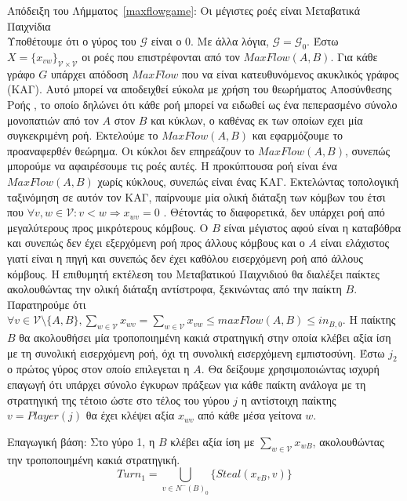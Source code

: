 \begin{sepproof}{Απόδειξη του Λήμματος~\ref{maxflowgame}: Οι μέγιστες ροές είναι Μεταβατικά Παιχνίδια} \ \\
\label{maxflowgameproof}
  Υποθέτουμε ότι ο γύρος του $\mathcal{G}$ είναι ο 0. Με άλλα λόγια, $\mathcal{G} = \mathcal{G}_0$. Έστω $X =
  \{x_{vw}\}_{\mathcal{V} \times \mathcal{V}}$ οι ροές που επιστρέφονται από τον $MaxFlow\left(A, B\right)$. Για κάθε γράφο
  $G$ υπάρχει απόδοση $MaxFlow$ που να είναι κατευθυνόμενος ακυκλικός γράφος (ΚΑΓ). Αυτό μπορεί να αποδειχθεί εύκολα με χρήση
  του θεωρήματος Αποσύνθεσης Ροής \cite{amo}, το οποίο δηλώνει ότι κάθε ροή μπορεί να ειδωθεί ως ένα πεπερασμένο σύνολο
  μονοπατιών από τον $A$ στον $B$ και κύκλων, ο καθένας εκ των οποίων εχει μία συγκεκριμένη ροή. Εκτελούμε το $MaxFlow\left(A,
  B\right)$ και εφαρμόζουμε το προαναφερθέν θεώρημα. Οι κύκλοι δεν επηρεάζουν το $MaxFlow\left(A, B\right)$, συνεπώς μπορούμε
  να αφαιρέσουμε τις ροές αυτές. Η προκύπτουσα ροή είναι ένα $MaxFlow\left(A, B\right)$ χωρίς κύκλους, συνεπώς είναι ένας ΚΑΓ.
  Εκτελώντας τοπολογική ταξινόμηση σε αυτόν τον ΚΑΓ, παίρνουμε μία ολική διάταξη των κόμβων του έτσι που $\forall v, w \in
  \mathcal{V} : v < w \Rightarrow x_{wv} = 0$ \cite{clrs}. Θέτοντάς το διαφορετικά, δεν υπάρχει ροή από μεγαλύτερους προς
  μικρότερους κόμβους. Ο $B$ είναι μέγιστος αφού είναι η καταβόθρα και συνεπώς δεν έχει εξερχόμενη ροή προς άλλους κόμβους και
  ο $A$ είναι ελάχιστος γιατί είναι η πηγή και συνεπώς δεν έχει καθόλου εισερχόμενη ροή από άλλους κόμβους. Η επιθυμητή
  εκτέλεση του Μεταβατικού Παιχνιδιού θα διαλέξει παίκτες ακολουθώντας την ολική διάταξη αντίστροφα, ξεκινώντας από την παίκτη
  $B$. Παρατηρού\-με ότι $\forall v \in \mathcal{V} \setminus \{A, B\}, \sum\limits_{w \in \mathcal{V}}x_{wv} = \sum\limits_{w
  \in \mathcal{V}}x_{vw} \leq maxFlow\left(A, B\right) \leq in_{B, 0}$. Η παίκτης $B$ θα ακολουθήσει μία τροποποιημένη κακιά
  στρατηγική στην οποία κλέβει αξία ίση με τη συνολική εισερχόμενη ροή, όχι τη συνολική εισερχόμενη εμπιστοσύνη. Έστω $j_2$ ο
  πρώτος γύρος στον οποίο επιλεγεται η $A$. Θα δείξουμε χρησιμοποιώντας ισχυρή επαγωγή ότι υπάρχει σύνολο έγκυρων πράξεων για
  κάθε παίκτη ανάλογα με τη στρατηγική της τέτοιο ώστε στο τέλος του γύρου $j$ η αντίστοιχη παίκτης $v = Player\left(j\right)$
  θα έχει κλέψει αξία $x_{wv}$ από κάθε μέσα γείτονα $w$.

  Επαγωγική βάση: Στο γύρο 1, η $B$ κλέβει αξία ίση με $\sum\limits_{w \in \mathcal{V}}x_{wB}$, ακολουθώντας την τροποποιημένη
  κακιά στρατηγική.
  \begin{equation*}
    Turn_1 = \bigcup\limits_{v \in N^{-}\left(B\right)_0}\{Steal\left(x_{vB}, v\right)\}
  \end{equation*}


\end{sepproof}
